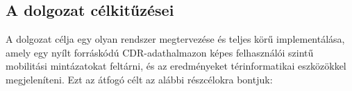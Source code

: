 



\subsection{A dolgozat célkitűzései}
\label{subsec:goals}

A dolgozat célja egy olyan rendszer megtervezése és teljes körű implementálása, amely egy nyílt forráskódú CDR-adathalmazon képes felhasználói szintű mobilitási mintázatokat feltárni, és az eredményeket térinformatikai eszközökkel megjeleníteni. Ezt az átfogó célt az alábbi részcélokra bontjuk:

